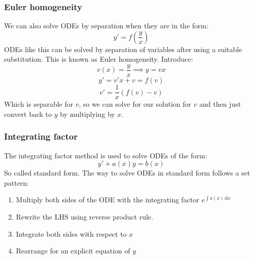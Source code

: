 \documentclass[12pt]{article}
\begin{document}
\subsubsection*{Euler homogeneity}
We can also solve ODEs by separation when they are in the form:
\[y'=f\left(\frac{y}{x}\right)\]
ODEs like this can be solved by separation of variables after using a suitable substitution. This is known as Euler homogeneity. Introduce:
\[v(x)=\frac{y}{x}\implies y=vx\]
\[y'=v'x+v=f(v)\]
\[v'=\frac{1}{x}\left(f(v)-v\right)\]
Which is separable for \(v\), so we can solve for our solution for \(v\) and then just convert back to \(y\) by multiplying by \(x\).
\subsubsection*{Integrating factor}
The integrating factor method is used to solve ODEs of the form:
\[y'+a(x)y=b(x)\]
So called standard form. The way to solve ODEs in standard form follows a set pattern:
\begin{enumerate}
    \item Multiply both sides of the ODE with the integrating factor \(e^{\int a(x)\,\text{d}x}\)
    \item Rewrite the LHS using reverse product rule.
    \item Integrate both sides with respect to \(x\)
    \item Rearrange for an explicit equation of \(y\)
\end{enumerate}
\end{document}
